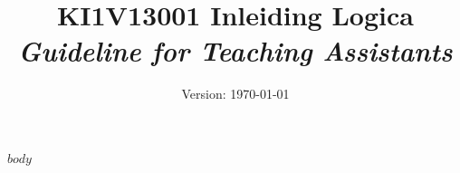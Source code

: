 \documentclass[a4paper,11pt,notitlepage]{uureport}
\title{KI1V13001 Inleiding Logica\\[2ex] \emph{Guideline for Teaching Assistants}}
\author{%
  ${for(lecturer)}
}
\date{Version: \today}
\begin{document}
\maketitle
$body$
\end{document}
